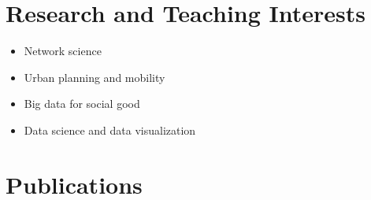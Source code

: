 \documentclass{academiccv}
\begin{document}
\section*{Research and Teaching Interests}

\begin{itemize}
	
\item Network science

\item Urban planning and mobility

\item Big data for social good

\item Data science and data visualization

\end{itemize}



\section*{Publications}


	









\end{document}
